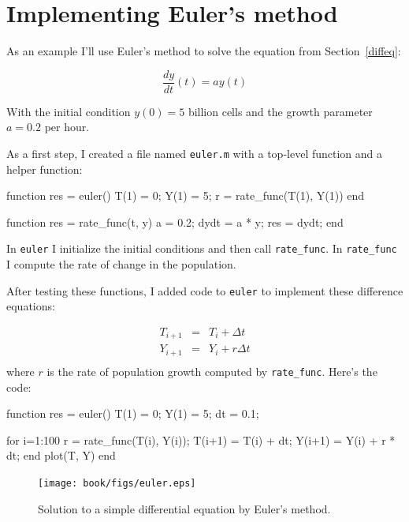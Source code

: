 \documentclass[main.tex]{subfiles}
\begin{document}
\section{Implementing Euler's method}

As an example I'll use Euler's method to solve the equation from Section~\ref{diffeq}:

\[ \frac{dy}{dt}(t) = a y(t) \]

With the initial condition $y(0) = 5$ billion cells and
the growth parameter $a = 0.2$ per hour. 


As a first step, I created a file named {\tt euler.m} with a top-level function and a helper function:

\begin{code}
function res = euler()
    T(1) = 0;
    Y(1) = 5;
    r = rate_func(T(1), Y(1))
end

function res = rate_func(t, y)
   a = 0.2;
   dydt = a * y;
   res = dydt;
end
\end{code}

In {\tt euler} I initialize the initial conditions and then call \verb"rate_func".  In \verb"rate_func" I compute the rate of change in the population.


After testing these functions, I added code to {\tt euler} to implement these difference equations:

\begin{eqnarray}
T_{i+1} &=& T_i + \Delta t             \\
Y_{i+1} &=& Y_i + r \Delta t           \\
\end{eqnarray}
%
where $r$ is the rate of population growth computed by \verb"rate_func".
Here's the code:

\begin{code}
function res = euler()
    T(1) = 0;
    Y(1) = 5;
    dt = 0.1;
    
    for i=1:100
        r = rate_func(T(i), Y(i));
        T(i+1) = T(i) + dt;
        Y(i+1) = Y(i) + r * dt;
    end
    plot(T, Y)
end
\end{code}

\begin{figure}
\centerline{\texttt{[image: book/figs/euler.eps]}}
\caption{Solution to a simple differential equation by Euler's method.}
\label{fig:euler}
\end{figure}
\end{document}
